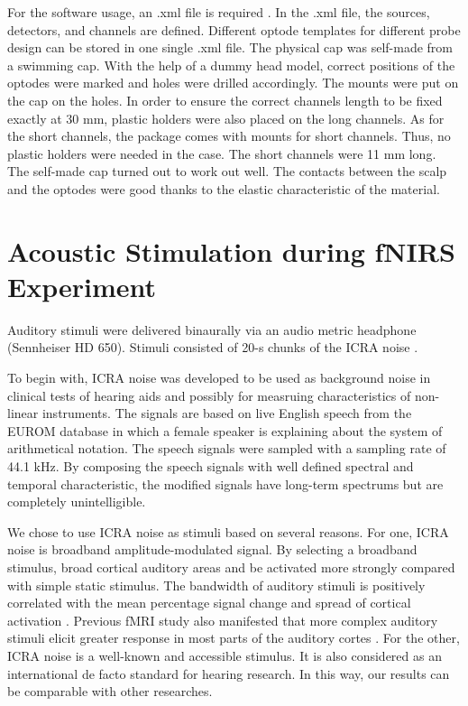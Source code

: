 For the software usage, an .xml file is required . In the .xml file, the sources, detectors, and channels are defined. Different optode templates for different probe design can be stored in one single .xml file. The physical cap was self-made from a swimming cap. With the help of a dummy head model, correct positions of the optodes were marked and holes were drilled accordingly. The mounts were put on the cap on the holes. In order to ensure the correct channels length to be fixed exactly at 30 mm, plastic holders were also placed on the long channels. As for the short channels, the  package comes with mounts for short channels. Thus, no plastic holders were needed in the case. The short channels were 11 mm long. The self-made cap turned out to work out well. The contacts between the scalp and the optodes were good thanks to the elastic characteristic of the material.



\section {Acoustic Stimulation during fNIRS Experiment}
Auditory stimuli were delivered binaurally via an audio metric headphone (Sennheiser HD 650). Stimuli consisted of 20-s chunks of the ICRA noise \cite {Dreschler}. 

To begin with, ICRA noise was developed to be used as background noise in clinical tests of hearing aids and possibly for measruing characteristics of non-linear instruments. The signals are based on live English speech from the EUROM database \cite {chanEUROM} in which a female speaker is explaining about the system of arithmetical notation. The speech signals were sampled with a sampling rate of 44.1 kHz. By composing the speech signals with well defined spectral and temporal characteristic, the modified signals have long-term spectrums but are completely unintelligible. 
 
We chose to use ICRA noise as stimuli based on several reasons. For one, ICRA noise is broadband amplitude-modulated signal. By selecting a broadband stimulus, broad cortical auditory areas and be activated more strongly compared with simple static stimulus. The bandwidth of auditory stimuli is positively correlated with the mean percentage signal change and spread of cortical activation \cite {Hall}. Previous fMRI study also manifested that more complex auditory stimuli elicit greater response in most parts of the auditory cortes \cite {Belin2002}. For the other, ICRA noise is a well-known and accessible stimulus. It is also considered as an international de facto standard for hearing research. In this way, our results can be comparable with other researches.
 
